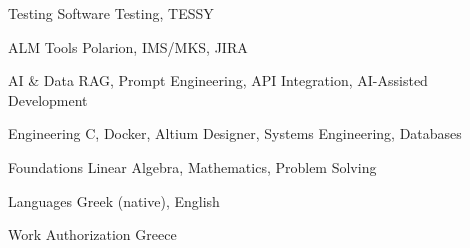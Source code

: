 
\begin{cvskills}

  \cvskill
    {Testing}
    {Software Testing, TESSY}

  \cvskill
    {ALM Tools}
    {Polarion, IMS/MKS, JIRA}

  \cvskill
    {AI \& Data}
    {RAG, Prompt Engineering, API Integration, AI-Assisted Development}

  \cvskill
    {Engineering}
    {C, Docker, Altium Designer, Systems Engineering, Databases}

  \cvskill
    {Foundations}
    {Linear Algebra, Mathematics, Problem Solving}

  \cvskill
    {Languages}
    {Greek (native), English}

  \cvskill
    {Work Authorization}
    {Greece}

\end{cvskills}
